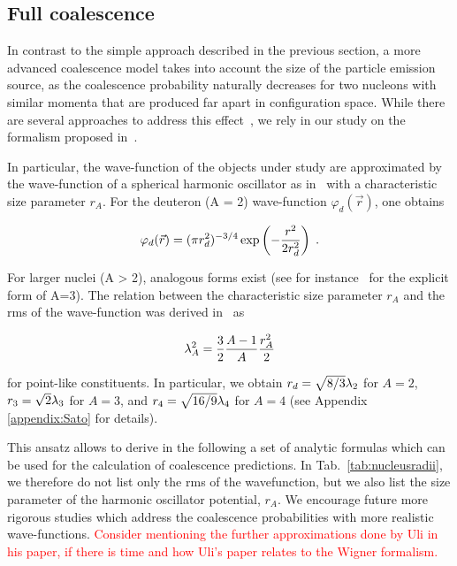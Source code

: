 \documentclass[a4paper,11pt]{scrartcl} %
\begin{document}
\subsection{Full coalescence}
\label{subsec:FullCoalescence}

In contrast to the simple approach described in the previous section, a more advanced coalescence model takes into account the size of the particle emission source, as the coalescence probability naturally decreases for two nucleons with similar momenta that are produced far apart in configuration space. While there are several approaches to address this effect~\cite{Sato:1981ez, Nagle:1996vp, Bergstrom:1979gpv, PapersWithWignerCitedinUli}, we rely in our study on the formalism proposed in~\cite{Scheibl:1998tk}. 

In particular, the wave-function of the objects under study are approximated by the wave-function of a spherical harmonic oscillator as in~\cite{Scheibl:1998tk} with a characteristic size parameter $r_{A}$. For the deuteron (A = 2) wave-function $\varphi_{d}(\vec{r}) $, one obtains

\begin{equation}\label{eq:WaveHeinz}
 \varphi_{d}(\vec{r}) = (\pi r_{d}^2)^{-3/4} \exp\left(-{r^2 \over 2 r_{d}^2}\right) \;.
\end{equation}

\noindent For larger nuclei (A > 2), analogous forms exist (see for instance~\cite{Scheibl:1998tk} for the explicit form of A=3). The relation between the characteristic size parameter $r_{A}$ and the rms of the wave-function was derived in~\cite{Shebeko:2006ud} as

\begin{equation}
 \lambda_{A}^2 = {3 \over 2}{A - 1 \over A} {r_{A}^2 \over 2}
\end{equation}

\noindent for point-like constituents. In particular, we obtain $r_{d}= \sqrt{8/3}  \lambda_{2}$ for $A = 2$, $r_{3}= \sqrt{2}{\lambda_{3}}$ for $A = 3$, and  $r_{4}= \sqrt{16/9} \lambda_{4}$ for $A=4$ (see Appendix \ref{appendix:Sato} for details).

This ansatz allows to derive in the following a set of analytic formulas which can be used for the calculation of coalescence predictions. In Tab.~\ref{tab:nucleusradii}, we therefore do not list only the rms of the wavefunction, but we also list the size parameter of the harmonic oscillator potential, $r_{A}$. We encourage future more rigorous studies which address the coalescence probabilities with more realistic wave-functions. \textcolor{red}{Consider mentioning the further  approximations done by Uli in his paper, if there is time and how Uli's paper relates to the Wigner formalism.}
\end{document}
